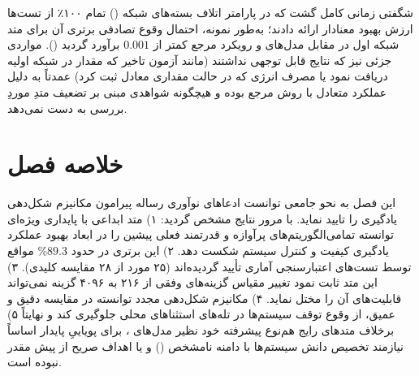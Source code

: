 \documentclass[oneside,openany,phd]{TMU-Thesis}
\begin{document}
شگفتی زمانی کامل گشت که در پارامتر اتلاف بسته‌های شبکه () تمام ۱۰۰٪ از تست‌ها ارزش بهبود معنادار ارائه دادند؛ به‌طور نمونه، احتمال وقوع تصادفی برتری آن برای متد  شبکه اول در مقابل مدل‌های  و رویکرد مرجع کمتر از $0.001$ برآورد گردید (). مواردی جزئی نیز که نتایج قابل توجهی نداشتند (مانند آزمون تاخیر که مقدار  در شبکه اولیه دریافت نمود یا مصرف انرژی که در حالت  مقداری معادل  ثبت کرد) عمدتاً به دلیل عملکرد متعادل با روش مرجع بوده و هیچگونه شواهدی مبنی بر تضعیف متدِ موردِ بررسی به دست نمی‌دهد.

\section{خلاصه فصل}

این فصل به نحو جامعی توانست ادعاهای نوآوری رساله پیرامون مکانیزم شکل‌دهی یادگیری را تایید نماید. با مرور نتایج مشخص گردید: ۱) متد ابداعی  با پایداری ویژه‌ای توانسته تمامی‌الگوریتم‌های پرآوازه و قدرتمند فعلی پیشین را در ابعاد بهبود عملکرد یادگیری کیفیت و کنترل سیستم شکست دهد. ۲) این برتری در حدود $89.3$\% مواقع توسط تست‌های اعتبارسنجی آماری تأیید گردیده‌اند (۲۵ مورد از ۲۸ مقایسه کلیدی). ۳) این متد ثابت نمود تغییر مقیاس گزینه‌های وفقی از ۲۱۶ به ۴۰۹۶ گزینه نمی‌تواند قابلیت‌های آن را مختل نماید. ۴) مکانیزم شکل‌دهی مجدد توانسته در مقایسه دقیق و عمیق، از وقوع توقف سیستم‌ها در تله‌های استثناهای محلی جلوگیری کند و نهایتاً ۵) برخلاف متدهای رایج هم‌نوع پیشرفته خود نظیر مدل‌های ، برای پویاییِ پایدار اساساً نیازمند تخصیص دانش سیستم‌ها با دامنه نامشخص () و یا اهداف صریح از پیش مقدر نبوده است.
\newpage




\ifstandalone


\fi
\end{document}
